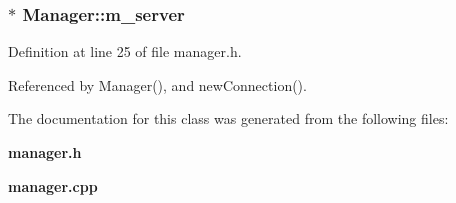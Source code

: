 \subsubsection{$\ast$ {\bf Manager::m\_\-server}\hspace{0.3cm}{\tt  [private]}}\label{classManager_5430d52079cf0e14d9d92971f3a229e5}




Definition at line 25 of file manager.h.

Referenced by Manager(), and newConnection().

The documentation for this class was generated from the following files:\begin{CompactItemize}
\item 
{\bf manager.h}\item 
{\bf manager.cpp}\end{CompactItemize}
